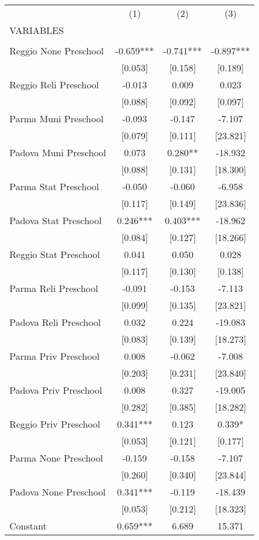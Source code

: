 \begin{tabular}{lccc} \hline
 & (1) & (2) & (3) \\
VARIABLES &  &  &  \\ \hline
 &  &  &  \\
Reggio None Preschool & -0.659*** & -0.741*** & -0.897*** \\
 & [0.053] & [0.158] & [0.189] \\
Reggio Reli Preschool & -0.013 & 0.009 & 0.023 \\
 & [0.088] & [0.092] & [0.097] \\
Parma Muni Preschool & -0.093 & -0.147 & -7.107 \\
 & [0.079] & [0.111] & [23.821] \\
Padova Muni Preschool & 0.073 & 0.280** & -18.932 \\
 & [0.088] & [0.131] & [18.300] \\
Parma Stat Preschool & -0.050 & -0.060 & -6.958 \\
 & [0.117] & [0.149] & [23.836] \\
Padova Stat Preschool & 0.246*** & 0.403*** & -18.962 \\
 & [0.084] & [0.127] & [18.266] \\
Reggio Stat Preschool & 0.041 & 0.050 & 0.028 \\
 & [0.117] & [0.130] & [0.138] \\
Parma Reli Preschool & -0.091 & -0.153 & -7.113 \\
 & [0.099] & [0.135] & [23.821] \\
Padova Reli Preschool & 0.032 & 0.224 & -19.083 \\
 & [0.083] & [0.139] & [18.273] \\
Parma Priv Preschool & 0.008 & -0.062 & -7.008 \\
 & [0.203] & [0.231] & [23.840] \\
Padova Priv Preschool & 0.008 & 0.327 & -19.005 \\
 & [0.282] & [0.385] & [18.282] \\
Reggio Priv Preschool & 0.341*** & 0.123 & 0.339* \\
 & [0.053] & [0.121] & [0.177] \\
Parma None Preschool & -0.159 & -0.158 & -7.107 \\
 & [0.260] & [0.340] & [23.844] \\
Padova None Preschool & 0.341*** & -0.119 & -18.439 \\
 & [0.053] & [0.212] & [18.323] \\
Constant & 0.659*** & 6.689 & 15.371 \\

\end{tabular}

